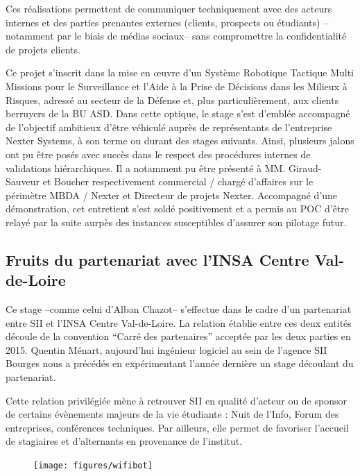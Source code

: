 Ces réalisations permettent de communiquer techniquement avec des acteurs internes et des parties prenantes externes (clients, prospects ou étudiants) --notamment par le biais de médias sociaux-- sans compromettre la confidentialité 
de projets clients. 

Ce projet s’inscrit dans la mise en \oe{}uvre d’un Système Robotique Tactique Multi Missions pour le Surveillance et l’Aide à la Prise de Décisions dans les Milieux à Risques, adressé au secteur de la Défense 
et, plus particulièrement, aux clients berruyers de la \gls{BU} \gls{ASD}.
Dans cette optique, le stage s'est d'emblée accompagné de l'objectif ambitieux d'être véhiculé auprès de représentants de l'entreprise Nexter Systems, à son terme ou durant des stages suivants.  
Ainsi, plusieurs jalons ont pu être posés avec succès dans le respect des procédures internes de validations hiérarchiques. 
Il a notamment pu être présenté à MM. Giraud-Sauveur et Boucher respectivement commercial / chargé d'affaires sur le périmètre MBDA / Nexter et Directeur de projets Nexter. 
Accompagné d'une démonstration, cet entretient s'est soldé positivement et a permis au \gls{POC} d'être relayé par la suite aurpès des instances susceptibles d'assurer son pilotage futur.  

\subsection{Fruits du partenariat avec l'INSA Centre Val-de-Loire}

Ce stage --comme celui d'Alban Chazot-- s'effectue dans le cadre d'un partenariat entre SII et l'INSA Centre Val-de-Loire. 
La relation établie entre ces deux entités découle de la convention ``Carré des partenaires'' acceptée par les deux parties en 2015.
Quentin Ménart, aujourd'hui ingénieur logiciel au sein de l'agence SII Bourges nous a précédés en expérimentant l'année dernière un stage découlant du partenariat.  

Cette relation privilégiée mène à retrouver SII en qualité d'acteur ou de sponsor de certains évènements majeurs de la vie étudiante : Nuit de l'Info, Forum des entreprises, conférences techniques.
Par ailleurs, elle permet de favoriser l'accueil de stagiaires et d'alternants en provenance de l'institut.  

\begin{figure}[h]
    \centering
    \texttt{[image: figures/wifibot]}
    \label{fig:Wifibot}
\end{figure}

